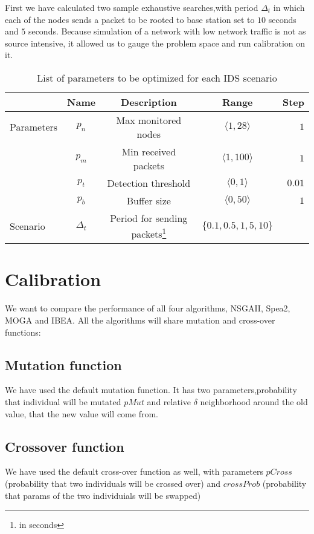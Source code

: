 \documentclass[12pt,oneside]{fithesis2}
\begin{document}
First we have calculated two sample exhaustive searches,with period $\Delta_t$ in which each of the nodes sends a packet to be rooted to base station set to $10$ seconds and $5$ seconds. Because simulation of a network with low network traffic is not as source intensive, it allowed us to gauge the problem space and run calibration on it.  

\begin{table}
  \centering
\begin{tabular}{ l c c c r}
  & Name & Description & Range & Step \\  
  \hline
  \hline                        
   Parameters & $p_n$ & Max monitored nodes & $\langle 1, 28 \rangle$ & $1$ \\
    & $p_m$ & Min received packets & $\langle 1, 100 \rangle$ & $1$ \\
    & $p_t$ & Detection threshold & $\langle 0, 1 \rangle$ & $0.01$ \\
    & $p_b$ & Buffer size & $\langle 0, 50 \rangle$ & $1$ \\
  \hline  
  \hline
  Scenario & $\Delta_t$ & Period for sending packets\footnote{in seconds} &  $\{ 0.1,0.5,1,5,10\}$  & \\
\end{tabular}
  \caption{List of parameters to be optimized for each IDS scenario}
  \label{tab:myfirsttable}
\end{table}

\section{Calibration}

We want to compare the performance of all four algorithms, NSGAII, Spea2, MOGA and IBEA. All the algorithms will share mutation and cross-over functions:

\subsection{Mutation function}
We have used the default mutation function. It has two parameters,probability that individual will be mutated $pMut$ and relative $\delta$ neighborhood around the old value, that the new value will come from.

\subsection{Crossover function}
We have used the default cross-over function as well, with parameters $pCross$ (probability that two individuals will be crossed over) and $crossProb$ (probability that params of the two individuials will be swapped)
\end{document}
